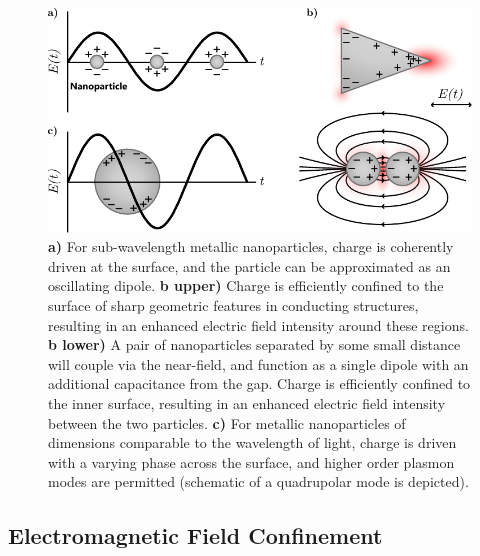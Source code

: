 \begin{figure}[htb!]
    \centering
    \includegraphics[scale=1.0]{./figures/background/plasmonics/lsp.pdf}
    \caption{\label{fig:background:Plasmonics:LSP} \textbf{a)} For sub-wavelength metallic nanoparticles, charge is coherently driven at the surface, and the particle can be approximated as an oscillating dipole. \textbf{b upper)} Charge is efficiently confined to the surface of sharp geometric features in conducting structures, resulting in an enhanced electric field intensity around these regions.  \textbf{b lower)} A pair of nanoparticles separated by some small distance will couple via the near-field, and function as a single dipole with an additional capacitance from the gap. Charge is efficiently confined to the inner surface, resulting in an enhanced electric field intensity between the two particles. \textbf{c)} For metallic nanoparticles of dimensions comparable to the wavelength of light, charge is driven with a varying phase across the surface, and higher order plasmon modes are permitted (schematic of a quadrupolar mode is depicted).}
\end{figure}


\subsection{Electromagnetic Field Confinement}\label{sec:Plasmonics:confinement}

